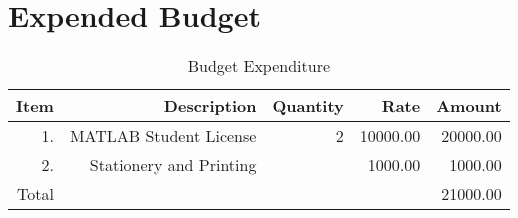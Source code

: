 \chapter*{Expended Budget}
\label{cap:budget}
\begin{table}[!h]
	\centering
	\ttfamily
	\renewcommand{\arraystretch}{1.5}
	{
		\begin{tabular}
			{r r r r r}
			\hline
			\rowcolor{gray!20} Item & Description & Quantity & Rate & Amount\\
			\hline
			1. & MATLAB Student License & 2 & 10000.00 & 20000.00\\
			2. & Stationery and Printing & & 1000.00 & 1000.00\\
			\hline
			\rowcolor{gray!20}Total&&&&21000.00
		\end{tabular}
	}
	\caption{Budget Expenditure}
\end{table}
\pagebreak
